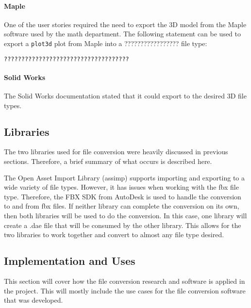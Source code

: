             \paragraph{Maple}

                One of the user stories required the need to export the 3D model from the Maple software used by the math department.  The following statement can be used to export a \texttt{plot3d} plot from Maple into a ????????????????? file type:

                \begin{center}
                    \texttt{????????????????????????????????????}
                \end{center}

            \paragraph{Solid Works}
                
            The Solid Works documentation stated that it could export to the desired 3D file types.

    \subsection{Libraries}

        The two libraries used for file conversion were heavily discussed in previous sections.  Therefore, a brief summary of what occurs is described here.

        The Open Asset Import Library (assimp) supports importing and exporting to a wide variety of file types.  However, it has issues when working with the fbx file type.  Therefore, the FBX SDK from AutoDesk is used to handle the conversion to and from fbx files.  If neither library can complete the conversion on its own, then both libraries will be used to do the conversion.  In this case, one library will create a .dae file that will be consumed by the other library.  This allows for the two libraries to work together and convert to almost any file type desired.

    \subsection{Implementation and Uses}

        This section will cover how the file conversion research and software is applied in the project.  This will mostly include the use cases for the file conversion software that was developed.

